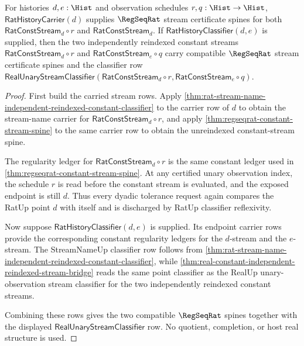 \begin{theorem}
\label{thm:regseqrat-reindexed-constant-stream-spine}
For histories $d,e:\Hist$ and observation schedules $r,q:\Hist\to\Hist$,
$\mathsf{RatHistoryCarrier}(d)$ supplies $\RegSeqRat$ stream certificate
spines for both $\mathsf{RatConstStream}_d\circ r$ and
$\mathsf{RatConstStream}_d$. If $\mathsf{RatHistoryClassifier}(d,e)$ is
supplied, then the two independently reindexed constant streams
$\mathsf{RatConstStream}_d\circ r$ and
$\mathsf{RatConstStream}_e\circ q$ carry compatible $\RegSeqRat$ stream
certificate spines and the classifier row
$\mathsf{RealUnaryStreamClassifier}(\mathsf{RatConstStream}_d\circ r,
\mathsf{RatConstStream}_e\circ q)$.
\end{theorem}
\begin{proof}
First build the carried stream rows. Apply
\autoref{thm:rat-stream-name-independent-reindexed-constant-classifier} to the
carrier row of $d$ to obtain the stream-name carrier for
$\mathsf{RatConstStream}_d\circ r$, and apply
\autoref{thm:regseqrat-constant-stream-spine} to the same carrier row to obtain
the unreindexed constant-stream spine.

The regularity ledger for $\mathsf{RatConstStream}_d\circ r$ is the same
constant ledger used in \autoref{thm:regseqrat-constant-stream-spine}. At any
certified unary observation index, the schedule $r$ is read before the constant
stream is evaluated, and the exposed endpoint is still $d$. Thus every dyadic
tolerance request again compares the RatUp point $d$ with itself and is
discharged by RatUp classifier reflexivity.

Now suppose $\mathsf{RatHistoryClassifier}(d,e)$ is supplied. Its endpoint
carrier rows provide the corresponding constant regularity ledgers for the
$d$-stream and the $e$-stream. The StreamNameUp classifier row follows from
\autoref{thm:rat-stream-name-independent-reindexed-constant-classifier}, while
\autoref{thm:real-constant-independent-reindexed-stream-bridge} reads the same
point classifier as the RealUp unary-observation stream classifier for the two
independently reindexed constant streams.

Combining these rows gives the two compatible $\RegSeqRat$ spines together with
the displayed $\mathsf{RealUnaryStreamClassifier}$ row. No quotient,
completion, or host real structure is used.
\end{proof}

